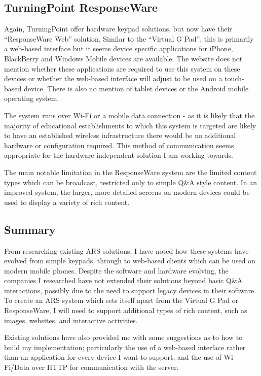 \documentclass[a4papert,11pt,notitlepage]{article}
\begin{document}
\begin{appendices}
\subsection{TurningPoint ResponseWare}
Again, TurningPoint\cite{responseware:web} offer hardware keypad solutions, but now have their ``ResponseWare Web'' solution. Similar to the ``Virtual G Pad'', this is primarily a web-based interface but it seems device specific applications for iPhone, BlackBerry and Windows Mobile devices are available. The website does not mention whether these applications are required to use this system on these devices or whether the web-based interface will adjust to be used on a touch-based device. There is also no mention of tablet devices or the Android mobile operating system.

The system runs over Wi-Fi or a mobile data connection - as it is likely that the majority of educational establishments to which this system is targeted are likely to have an established wireless infrastructure there would be no additional hardware or configuration required. This method of communication seems appropriate for the hardware independent solution I am working towards.

The main notable limitation in the ResponseWare system are the limited content types which can be broadcast, restricted only to simple Q\&A style content. In an improved system, the larger, more detailed screens on modern devices could be used to display a variety of rich content.

\subsection{Summary}
From researching existing ARS solutions, I have noted how these systems have evolved from simple keypads, through to web-based clients which can be used on modern mobile phones. Despite the software and hardware evolving, the companies I researched have not extended their solutions beyond basic Q\&A interactions, possibly due to the need to support legacy devices in their software. To create an ARS system which sets itself apart from the Virtual G Pad or ResponseWare, I will need to support additional types of rich content, such as images, websites, and interactive activities.

Existing solutions have also provided me with some suggestions as to how to build my implementation; particularly the use of a web-based interface rather than an application for every device I want to support, and the use of Wi-Fi/Data over HTTP for communication with the server.


\end{appendices}
\end{document}
